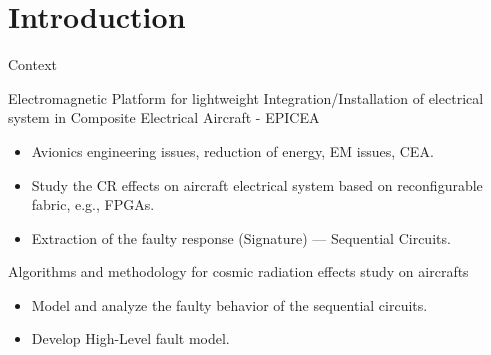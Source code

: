 \documentclass[aspectratio=1610]{beamer}
\newcommand{\semitransp}[2][35]{\color{fg!#1}#2}
\begin{document}
\section{Introduction}
\begin{frame}{Context}

\begin{block}{Electromagnetic Platform for lightweight Integration/Installation of electrical system in Composite Electrical Aircraft - EPICEA}
\end{block}
\begin{itemize}
\item Avionics engineering issues, reduction of energy, EM issues, CEA.
\item Study the CR effects on aircraft electrical system based on reconfigurable fabric, e.g., FPGAs.
\item Extraction of the faulty response (Signature) --- Sequential Circuits.

\end{itemize}


\begin{block}{Algorithms and methodology for cosmic radiation effects study on aircrafts}
\end{block}
\begin{itemize}
\item Model and analyze the faulty behavior of the sequential circuits.
\item Develop High-Level fault model. 

\end{itemize}




\end{frame}
\end{document}
